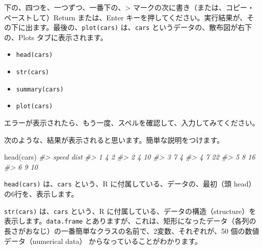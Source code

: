 \documentclass[
]{bxjsbook}
\newenvironment{Shaded}{\begin{snugshade}}{\end{snugshade}}
\newcommand{\CommentTok}[1]{\textcolor[rgb]{0.56,0.35,0.01}{\textit{#1}}}
\newcommand{\FunctionTok}[1]{\textcolor[rgb]{0.00,0.00,0.00}{#1}}
\newcommand{\NormalTok}[1]{#1}
\providecommand{\tightlist}{%
  \setlength{\itemsep}{0pt}\setlength{\parskip}{0pt}}
\theoremstyle{definition}
\theoremstyle{definition}
\theoremstyle{definition}
\theoremstyle{definition}
\theoremstyle{remark}
\begin{document}
下の、四つを、一つずつ、一番下の、\textgreater{} マークの次に書き（または、コピー・ペーストして）Return または、Enter キーを押してください。実行結果が、その下に出ます。最後の、\texttt{plot(cars)} は、\texttt{cars} というデータの、散布図が右下の、Plots タブに表示されます。

\begin{itemize}
\tightlist
\item
  \texttt{head(cars)}
\item
  \texttt{str(cars)}
\item
  \texttt{summary(cars)}
\item
  \texttt{plot(cars)}
\end{itemize}

エラーが表示されたら、もう一度、スペルを確認して、入力してみてください。

次のような、結果が表示されると思います。簡単な説明をつけます。

\begin{Shaded}
\begin{Highlighting}[]
\FunctionTok{head}\NormalTok{(cars)}
\CommentTok{\#\textgreater{}   speed dist}
\CommentTok{\#\textgreater{} 1     4    2}
\CommentTok{\#\textgreater{} 2     4   10}
\CommentTok{\#\textgreater{} 3     7    4}
\CommentTok{\#\textgreater{} 4     7   22}
\CommentTok{\#\textgreater{} 5     8   16}
\CommentTok{\#\textgreater{} 6     9   10}
\end{Highlighting}
\end{Shaded}

\texttt{head(cars)} は、\texttt{cars} という、R に付属している、データの、最初（頭 head）の6行を、表示します。

\begin{Shaded}
\end{Shaded}

\texttt{str(cars)} は、\texttt{cars} という、R に付属している、データの構造（structure）を表示します。\texttt{data.frame} とありますが、これは、矩形になったデータ（各列の長さがおなじ）の一番簡単なクラスの名前で、2変数、それぞれが、50 個の数値データ（numerical data） からなっていることがわかります。
\end{document}
